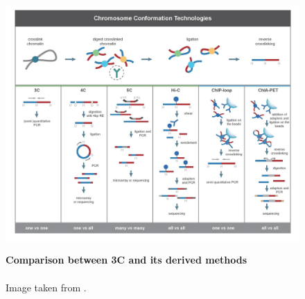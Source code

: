 
\begin{figure}[t]
\begin{centering}

    {\includegraphics[scale=0.75]{figures/background/Chromosome_conformation_techniques.jpg}}
    \caption[Comparison between 3C and its derived methods]
    {\textbf{Comparison between 3C and its derived methods} \\ \\ Image taken from \cite{Li2014}.}
    \label{fig:comparison3C}\label{fig:cct}
\end{centering}
\end{figure}



